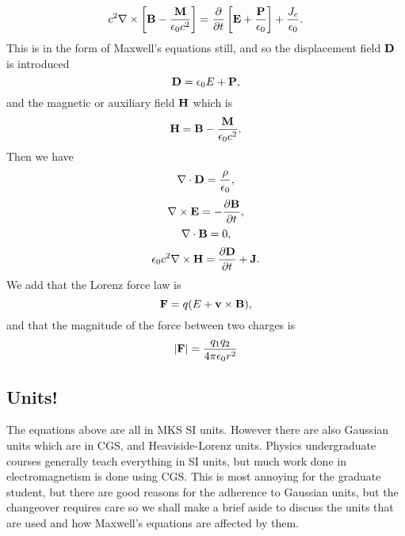 \begin{equation}
c^2 \nabla \times \left \lbrack
 {\bf B}- \frac{{\bf M}}{\epsilon_0 c^2}
 \right \rbrack
=\frac{\partial }{\partial t} \left  \lbrack {\bf E}+ \frac{{\bf P}}{\epsilon_0} \right \rbrack 
+\frac{J_e}{\epsilon_0}.
\end{equation}
This is in the form of Maxwell's equations still, and so the 
displacement field ${\bf D}$ is introduced
\begin{equation}
{\bf D}= \epsilon_0 E+{\bf P},
\end{equation}
and the magnetic or auxiliary field ${\bf H}$ which is
\begin{equation}
{\bf H}={\bf B}-\frac{{\bf M}}{\epsilon_0 c^2}.
\end{equation}
Then we have
\begin{equation}
 \nabla \cdot {\bf D}=\frac{\rho}{\epsilon_0},
\end{equation}
\begin{equation}
\nabla \times {\bf E}=-\frac{\partial {\bf B}}{\partial t},
\end{equation}
\begin{equation}
 \nabla \cdot {\bf B}=0,
\end{equation}
\begin{equation}
\epsilon_0 c^2 \nabla \times {\bf H}=\frac{\partial {\bf D}}{\partial t} 
+{\bf J}.
\end{equation}
We add that the Lorenz force law is
\begin{equation}
{\bf F}=q ( {\bf} E + {\bf v} \times {\bf B}),
\end{equation}
and that the magnitude of the force between two charges is
\begin{equation}
\vert {\bf F} \vert= \frac{ q_1 q_2}{ 4 \pi \epsilon_0 r^2}
\end{equation}

\subsection{Units!}

The equations above are all in MKS SI units. However there are also 
Gaussian units which are in CGS, and Heaviside-Lorenz units. Physics undergraduate courses generally teach everything in SI units, but much work done in
electromagnetism is done using CGS. This is most annoying for the graduate student, but there are good reasons for the adherence to Gaussian units, but the changeover requires care so we shall make a brief aside to discuss the units that are used and how Maxwell's equations are affected by them.

